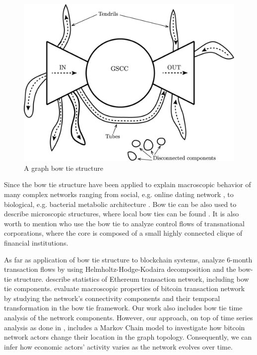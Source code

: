 \documentclass{Resources/netsci-project}
\begin{document}
\begin{figure}[!htb]
    \centering
    \includegraphics[width=0.75\linewidth]{Resources/bowtie.png}
    \caption{A graph bow tie structure \autocite{Fujita2019}} 
    \label{fig:bowtie1}
\end{figure}

Since \textcite{Broder2000} the bow tie structure have been applied to explain macroscopic behavior of many complex networks ranging from social, e.g. online dating network \autocite{Chen2011}, to biological, e.g. bacterial metabolic architecture \autocite{Csete2004}. Bow tie can be also used to describe microscopic structures, where local bow ties can be found \autocite{Mattie2018, Fujita2019}. It is also worth to mention \textcite{Vitali2011} who use the bow tie to analyze control flows of transnational corporations, where the core is composed of a small highly connected clique of financial institutions.

As far as application of bow tie structure to blockchain systems, \textcite{Fujiwara2020} analyze 6-month transaction flows by using Helmholtz-Hodge-Kodaira decomposition and the bow-tie structure. \textcite{Guo2019} describe statistics of Ethereum transaction network, including bow tie components. \textcite{Maesa2019} evaluate macroscopic properties of bitcoin transaction network by studying the network's connectivity components and their temporal transformation in the bow tie framework. Our work also includes bow tie time analysis of the network components. However, our approach, on top of time series analysis as done in \textcite{Maesa2019}, includes a  Markov Chain model to investigate how bitcoin network actors change their location in the graph topology. Consequently, we can infer how economic actors' activity varies as the network evolves over time. 
\end{document}

